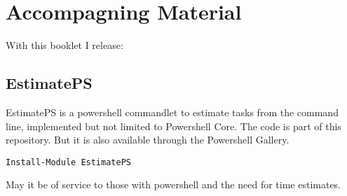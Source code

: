 \hypertarget{accompagning-material}{%
\section{Accompagning Material}\label{accompagning-material}}

With this booklet I release:

\hypertarget{estimateps}{%
\subsection{EstimatePS}\label{estimateps}}

EstimatePS is a powershell commandlet to estimate tasks from the command
line, implemented but not limited to Powershell Core. The code is part
of this repository. But it is also available through the Powershell
Gallery.

\begin{verbatim}
Install-Module EstimatePS
\end{verbatim}

May it be of service to those with powershell and the need for time estimates.
